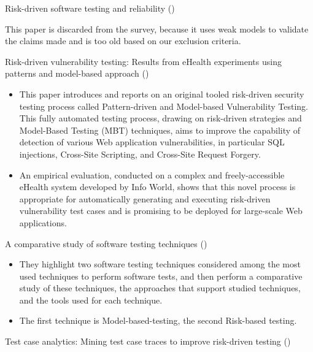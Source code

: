 \documentclass[]{book}
\providecommand{\tightlist}{%
  \setlength{\itemsep}{0pt}\setlength{\parskip}{0pt}}
\begin{document}
Risk-driven software testing and reliability (\citet{schneidewind2007})

This paper is discarded from the survey, because it uses weak models to
validate the claims made and is too old based on our exclusion criteria.

Risk-driven vulnerability testing: Results from eHealth experiments
using patterns and model-based approach (\citet{vernotte2015})

\begin{itemize}
\tightlist
\item
  This paper introduces and reports on an original tooled risk-driven
  security testing process called Pattern-driven and Model-based
  Vulnerability Testing. This fully automated testing process, drawing
  on risk-driven strategies and Model-Based Testing (MBT) techniques,
  aims to improve the capability of detection of various Web application
  vulnerabilities, in particular SQL injections, Cross-Site Scripting,
  and Cross-Site Request Forgery.
\item
  An empirical evaluation, conducted on a complex and freely-accessible
  eHealth system developed by Info World, shows that this novel process
  is appropriate for automatically generating and executing risk-driven
  vulnerability test cases and is promising to be deployed for
  large-scale Web applications.
\end{itemize}

A comparative study of software testing techniques (\citet{atifi2017})

\begin{itemize}
\tightlist
\item
  They highlight two software testing techniques considered among the
  most used techniques to perform software tests, and then perform a
  comparative study of these techniques, the approaches that support
  studied techniques, and the tools used for each technique.
\item
  The first technique is Model-based-testing, the second Risk-based
  testing.
\end{itemize}

Test case analytics: Mining test case traces to improve risk-driven
testing (\citet{noor2015test})
\end{document}
